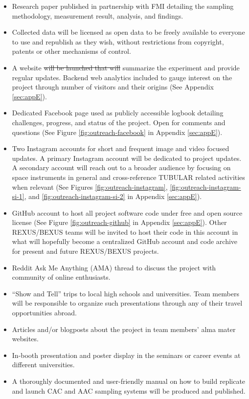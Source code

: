 \documentclass[a4paper,12pt,twoside]{article}
\providecommand{\DIFaddtex}[1]{{\protect\color{blue}\uwave{#1}}} %
\providecommand{\DIFdeltex}[1]{{\protect\color{red}\sout{#1}}}                      %
\providecommand{\DIFaddbegin}{} %
\providecommand{\DIFaddend}{} %
\providecommand{\DIFdelbegin}{} %
\providecommand{\DIFdelend}{} %
\providecommand{\DIFadd}[1]{\texorpdfstring{\DIFaddtex{#1}}{#1}} %
\providecommand{\DIFdel}[1]{\texorpdfstring{\DIFdeltex{#1}}{}} %
\newcommand{\DIFscaledelfig}{0.5}
\newlength{\DIFdelgraphicswidth} %
\newlength{\DIFdelgraphicsheight} %
\newcommand{\DIFaddincludegraphics}[2][]{{\color{blue}\fbox{\DIFOincludegraphics[#1]{#2}}}} %
\newcommand{\DIFdelincludegraphics}[2][]{%
\sbox{\DIFdelgraphicsbox}{\DIFOincludegraphics[#1]{#2}}%
\settoboxwidth{\DIFdelgraphicswidth}{\DIFdelgraphicsbox} %
\settoboxtotalheight{\DIFdelgraphicsheight}{\DIFdelgraphicsbox} %
\scalebox{\DIFscaledelfig}{%
\parbox[b]{\DIFdelgraphicswidth}{\usebox{\DIFdelgraphicsbox}\\[-\baselineskip] \rule{\DIFdelgraphicswidth}{0em}}\llap{\resizebox{\DIFdelgraphicswidth}{\DIFdelgraphicsheight}{%
\setlength{\unitlength}{\DIFdelgraphicswidth}%
\begin{picture}(1,1)%
\thicklines\linethickness{2pt} %
{\color[rgb]{1,0,0}\put(0,0){\framebox(1,1){}}}%
{\color[rgb]{1,0,0}\put(0,0){\line( 1,1){1}}}%
{\color[rgb]{1,0,0}\put(0,1){\line(1,-1){1}}}%
\end{picture}%
}\hspace*{3pt}}} %
} %
\DeclareRobustCommand{\DIFaddbegin}{\DIFOaddbegin \let\includegraphics\DIFaddincludegraphics} %
\DeclareRobustCommand{\DIFaddend}{\DIFOaddend \let\includegraphics\DIFOincludegraphics} %
\DeclareRobustCommand{\DIFdelbegin}{\DIFOdelbegin \let\includegraphics\DIFdelincludegraphics} %
\DeclareRobustCommand{\DIFdelend}{\DIFOaddend \let\includegraphics\DIFOincludegraphics} %
\begin{document}
\begin{itemize}
\item Research paper published in partnership with FMI detailing the sampling methodology, measurement result, analysis, and findings.
\item Collected data will be licensed as open data to be freely available to everyone to use and republish as they wish, without restrictions from copyright, patents or other mechanisms of control.
\item A website \DIFdelbegin \DIFdel{will be launched that will }\DIFdelend \DIFaddbegin \DIFadd{to }\DIFaddend summarize the experiment and provide regular updates. Backend web analytics included to gauge interest on the project through number of visitors and their origins (See Appendix \ref{sec:appE}).
\item Dedicated Facebook page used as publicly accessible logbook detailing challenges, progress, and status of the project. Open for comments and questions (See Figure \ref{fig:outreach-facebook} in Appendix \ref{sec:appE}).
\item Two Instagram accounts for short and frequent image and video focused updates. A primary Instagram account will be dedicated to project updates. A secondary account will reach out to a broader audience by focusing on space instruments in general and cross-reference TUBULAR related activities when relevant (See Figures \ref{fig:outreach-instagram}, \ref{fig:outreach-instagram-si-1}, and \ref{fig:outreach-instagram-si-2} in Appendix \ref{sec:appE}).
\item GitHub account to host all project software code under free and open source license (See Figure \ref{fig:outreach-github} in Appendix \ref{sec:appE}). Other REXUS/BEXUS teams will be invited to host their code in this account in what will hopefully become a centralized GitHub account and code archive for present and future REXUS/BEXUS projects.
\item Reddit Ask Me Anything (AMA) thread to discuss the project with community of online enthusiasts.
\item\enquote{Show and Tell} trips to local high schools and universities. Team members will be responsible to organize such presentations through any of their travel opportunities abroad.
\item Articles and/or blogposts about the project in team members' alma mater websites.
\item In-booth presentation and poster display in the seminars or career events at different universities. 
\item A thoroughly documented and user-friendly manual on how to build replicate and launch CAC and AAC sampling systems will be produced and published.
\end{itemize}
\pagebreak
\end{document}
